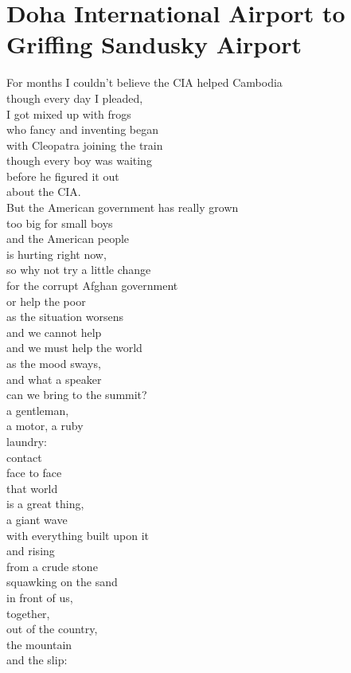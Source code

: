 \documentclass[smalldemyvopaper,11pt,twoside,onecolumn,openright,extrafontsizes]{memoir}
\begin{document}
\chapter{Doha International Airport to Griffing Sandusky Airport}
For months I couldn't believe the CIA helped Cambodia
\\though every day I pleaded,
\\I got mixed up with frogs
\\who fancy and inventing began
\\with Cleopatra joining the train
\\though every boy was waiting
\\before he figured it out
\\about the CIA.
\\But the American government has really grown
\\too big for small boys
\\and the American people
\\is hurting right now,
\\so why not try a little change
\\for the corrupt Afghan government
\\or help the poor
\\as the situation worsens
\\and we cannot help
\\and we must help the world
\\as the mood sways,
\\and what a speaker
\\can we bring to the summit?
\\a gentleman,
\\a motor, a ruby
\\laundry:
\\contact
\\face to face
\\that world
\\is a great thing,
\\a giant wave
\\with everything built upon it
\\and rising
\\from a crude stone
\\squawking on the sand
\\in front of us,
\\together,
\\out of the country,
\\the mountain
\\and the slip:
\end{document}
